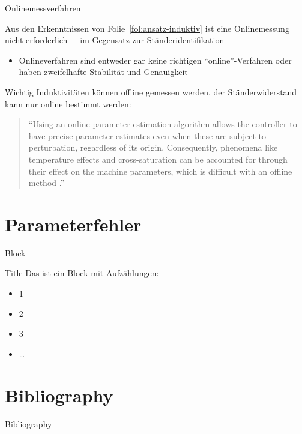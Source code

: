 \documentclass{beamer}
\begin{document}
\begin{frame}{Onlinemessverfahren}

Aus den Erkenntnissen von Folie~\ref{fol:ansatz-induktiv} ist eine Onlinemessung nicht erforderlich~--~im Gegensatz zur Ständeridentifikation

\begin{itemize}
	\item Onlineverfahren sind entweder gar keine richtigen \enquote{online}-Verfahren oder haben zweifelhafte Stabilität und Genauigkeit \autocite{underwood_online_2010}
\end{itemize}
\end{frame}

\begin{frame}
\begin{alertblock}{Wichtig}
	Induktivitäten können offline gemessen werden, der Ständerwiderstand kann nur online bestimmt werden:
\end{alertblock}

	\begin{quote}
		\enquote{Using an online parameter estimation algorithm allows the controller to have precise parameter estimates even when these are subject to perturbation, regardless of its origin. Consequently, phenomena like temperature effects and cross-saturation can be accounted for through their effect on the machine parameters, which is difficult with an offline method \autocite[S.~1]{underwood_online_2010}.}
	\end{quote}

\end{frame}

\section{Parameterfehler}
\begin{frame}

\end{frame}

\begin{frame}{Block}
\begin{block}{Title}
Das ist ein Block mit Aufzählungen:
\begin{itemize}
	\item 1
	\item 2
	\item 3
	\item \ldots
\end{itemize}
\end{block}
\end{frame}

\section*{Bibliography}
\begin{frame}[allowframebreaks]{Bibliography}
\printbibliography
\end{frame}
\end{document}
